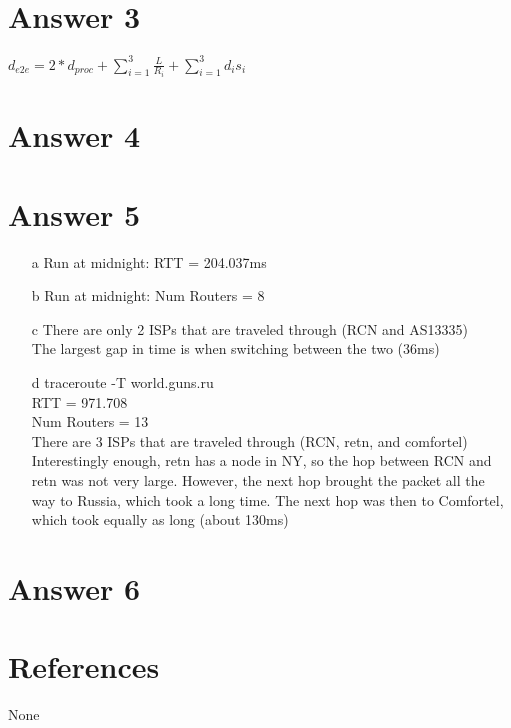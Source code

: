 \documentclass[11pt]{article}
\theoremstyle{definition}
\begin{document}
\section*{Answer 3}
$d_{e2e} = 2*d_{proc} + \sum_{i=1}^3 \frac{L}{R_i} + \sum_{i=1}^3 d_i s_i$

\section*{Answer 4}

\section*{Answer 5}
\begin{enumerate}
	traceroute -T reddit.com\\
	\item[a]
	Run at midnight: RTT = 204.037ms\\

	\item[b]
	Run at midnight: Num Routers = 8\\

	\item[c]
	There are only 2 ISPs that are traveled through (RCN and AS13335)\\
	The largest gap in time is when switching between the two (36ms)\\

	\item[d]
	traceroute -T world.guns.ru\\
	RTT = 971.708\\
	Num Routers = 13\\
	There are 3 ISPs that are traveled through (RCN, retn, and comfortel)\\
	Interestingly enough, retn has a node in NY, so the hop between RCN and retn was not very large.  However, the next hop brought the packet all the way to Russia, which took a long time.  The next hop was then to Comfortel, which took equally as long (about 130ms)\\
\end{enumerate}

\section*{Answer 6}


\noindent\hrulefill


\section*{References}

None
\end{document}
